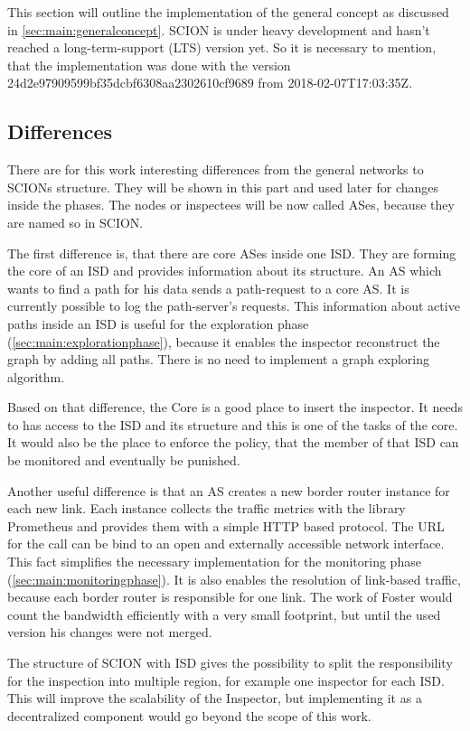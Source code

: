 \documentclass[thesis.tex]{subfiles}
\begin{document}
This section will outline the implementation of the general concept as discussed in \autoref{sec:main:generalconcept}. SCION is under heavy development and hasn't reached a long-term-support (LTS) version yet. So it is necessary to mention, that the implementation was done with the version  24d2e97909599bf35dcbf6308aa2302610cf9689 from 2018-02-07T17:03:35Z. 

\subsection{Differences}

There are for this work interesting differences from the general networks to SCIONs structure. They will be shown in this part and used later for changes inside the phases. The nodes or inspectees will be now called ASes, because they are named so in SCION.

The first difference is, that there are core ASes inside one ISD. They are forming the core of an ISD and provides information about its structure. An AS which wants to find a path for his data sends a path-request to a core AS. It is currently possible to log the path-server's requests. This information about active paths inside an ISD is useful for the exploration phase (\autoref{sec:main:explorationphase}), because it enables the inspector reconstruct the graph by adding all paths. There is no need to implement a graph exploring algorithm.

Based on that difference, the Core is a good place to insert the inspector. It needs to has access to the ISD and its structure and this is one of the tasks of the core. It would also be the place to enforce the policy, that the member of that ISD can be monitored and eventually be punished. 

Another useful difference is that an AS creates a new border router instance for each new link. Each instance collects the traffic metrics with the library Prometheus and provides them with a simple HTTP based protocol. The URL for the call can be bind to an open and externally accessible network interface. This fact simplifies the necessary implementation for the monitoring phase (\autoref{sec:main:monitoringphase}). It is also enables the resolution of link-based traffic, because each border router is responsible for one link. The work of Foster\cite{Forster.September2017} would count the bandwidth efficiently with a very small footprint, but until the used version his changes were not merged. 

The structure of SCION with ISD gives the possibility to split the responsibility for the inspection into multiple region, for example one inspector for each ISD. This will improve the scalability of the Inspector, but implementing it as a decentralized component would go beyond the scope of this work.
\end{document}
